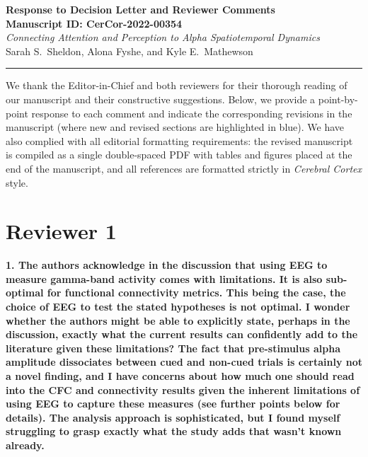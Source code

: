 \documentclass[11pt]{article}
\newcommand{\revcomment}[1]{\vspace{6pt}\noindent\textbf{\textcolor{commentgray}{#1}}\par\vspace{2pt}}
\begin{document}
\begin{center}
{\Large \textbf{Response to Decision Letter and Reviewer Comments}}\\[6pt]
{\large \textbf{Manuscript ID: CerCor-2022-00354}}\\[4pt]
\textit{Connecting Attention and Perception to Alpha Spatiotemporal Dynamics}\\
Sarah S.\ Sheldon, Alona Fyshe, and Kyle E.\ Mathewson
\end{center}

\vspace{8pt}
\hrule
\vspace{8pt}

We thank the Editor-in-Chief and both reviewers for their thorough reading of our manuscript and their constructive suggestions. Below, we provide a point-by-point response to each comment and indicate the corresponding revisions in the manuscript (where new and revised sections are highlighted in blue). We have also complied with all editorial formatting requirements: the revised manuscript is compiled as a single double-spaced PDF with tables and figures placed at the end of the manuscript, and all references are formatted strictly in \textit{Cerebral Cortex} style.

\section*{Reviewer 1}

\revcomment{1. The authors acknowledge in the discussion that using EEG to measure gamma-band activity comes with limitations. It is also sub-optimal for functional connectivity metrics. This being the case, the choice of EEG to test the stated hypotheses is not optimal. I wonder whether the authors might be able to explicitly state, perhaps in the discussion, exactly what the current results can confidently add to the literature given these limitations? The fact that pre-stimulus alpha amplitude dissociates between cued and non-cued trials is certainly not a novel finding, and I have concerns about how much one should read into the CFC and connectivity results given the inherent limitations of using EEG to capture these measures (see further points below for details). The analysis approach is sophisticated, but I found myself struggling to grasp exactly what the study adds that wasn't known already.}
\end{document}
